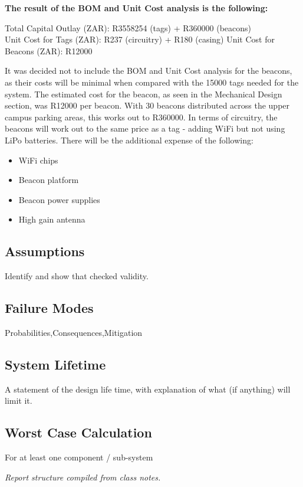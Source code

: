 \textbf{The result of the BOM and Unit Cost analysis is the following:}

Total Capital Outlay (ZAR): R3558254 (tags) + R360000 (beacons)\\
Unit Cost for Tags (ZAR): R237 (circuitry) + R180 (casing)
Unit Cost for Beacons (ZAR): R12000

It was decided not to include the BOM and Unit Cost analysis for the beacons, as their costs will be minimal when compared with the 15000 tags needed for the system. The estimated cost for the beacon, as seen in the Mechanical Design section, was R12000 per beacon. With 30 beacons distributed across the upper campus parking areas, this works out to R360000. In terms of circuitry, the beacons will work out to the same price as a tag - adding WiFi but not using LiPo batteries. There will be the additional expense of the following:

\begin{itemize}
\item WiFi chips
\item Beacon platform
\item Beacon power supplies
\item High gain antenna 
\end{itemize}

\subsection{Assumptions}
Identify and show that checked validity.
\subsection{Failure Modes}
Probabilities,Consequences,Mitigation
\subsection{System Lifetime}
A statement of the design life time, with explanation of what (if anything) will limit it.
\subsection{Worst Case Calculation}
For at least one component / sub-system 

\textit{Report structure compiled from class notes.}\cite{handout}\cite{notes}


